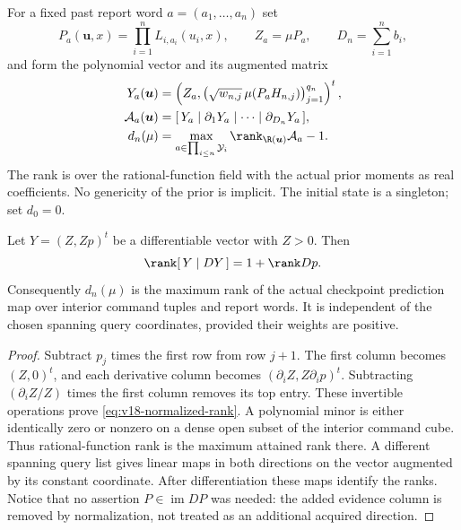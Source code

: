 For a fixed past report word $a=(a_1,\ldots,a_n)$ set
\[
 P_a(\boldsymbol u,x)=\prod_{i=1}^nL_{i,a_i}(u_i,x),\qquad
 Z_a=\mu P_a,\qquad D_n=\sum_{i=1}^nb_i,
\]
and form the polynomial vector and its augmented matrix
\begin{equation}\label{eq:v18-augmented-matrix}
 \begin{split}
 Y_a(\boldsymbol u)&=
 \left(Z_a,\bigl(\sqrt{w_{n,j}}\,\mu(P_aH_{n,j})\bigr)_{j=1}^{q_n}\right)^t,\\
 \mathcal A_a(\boldsymbol u)&=
 [\,Y_a\mid\partial_1Y_a\mid\cdots\mid\partial_{D_n}Y_a\,],\\
 d_n(\mu)&=\max_{a\in\prod_{i\le n}\mathcal Y_i}
       \rank_{\R(\boldsymbol u)}\mathcal A_a-1.
 \end{split}
\end{equation}
The rank is over the rational-function field with the actual prior
moments as real coefficients. No genericity of the prior is implicit.
The initial state is a singleton; set $d_0=0$.

\begin{lemma}\label{lem:v18-normalized-rank}
Let $Y=(Z,Zp)^t$ be a differentiable vector with $Z>0$. Then
\begin{equation}\label{eq:v18-normalized-rank}
 \rank[\,Y\mid DY\,]=1+\rank Dp.
\end{equation}
Consequently $d_n(\mu)$ is the maximum rank of the actual checkpoint
prediction map over interior command tuples and report words. It is
independent of the chosen spanning query coordinates, provided their
weights are positive.
\end{lemma}
\begin{proof}
Subtract $p_j$ times the first row from row $j+1$. The first column
becomes $(Z,0)^t$, and each derivative column becomes
$(\partial_iZ,Z\partial_ip)^t$. Subtracting
$(\partial_iZ/Z)$ times the first column removes its top entry.
These invertible operations prove \eqref{eq:v18-normalized-rank}.
A polynomial minor is either identically zero or nonzero on a dense
open subset of the interior command cube. Thus rational-function rank
is the maximum attained rank there. A different spanning query list
gives linear maps in both directions on the vector augmented by its
constant coordinate. After differentiation these maps identify the
ranks. Notice that no assertion $P\in\operatorname{im}DP$ was needed:
the added evidence column is removed by normalization, not treated as
an additional acquired direction.
\end{proof}

